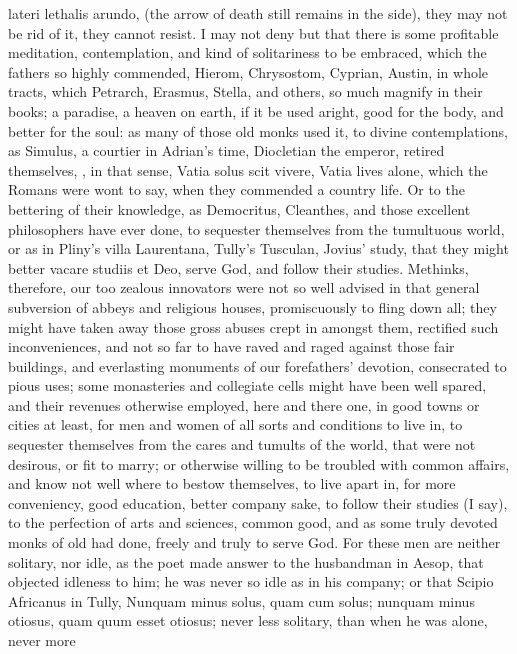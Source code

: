 {{lateri lethalis arundo, (the arrow of death still remains in the side),
they may not be rid of it, they cannot resist. I may not deny but
that there is some profitable meditation, contemplation, and kind of
solitariness to be embraced, which the fathers so highly commended,
 Hierom, Chrysostom, Cyprian, Austin, in whole tracts, which
Petrarch, Erasmus, Stella, and others, so much magnify in their books;
a paradise, a heaven on earth, if it be used aright, good for the body,
and better for the soul: as many of those old monks used it, to divine
contemplations, as Simulus, a courtier in Adrian's time, Diocletian the
emperor, retired themselves, \etc{}, in that sense, Vatia solus scit
vivere, Vatia lives alone, which the Romans were wont to say, when they
commended a country life. Or to the bettering of their knowledge, as
Democritus, Cleanthes, and those excellent philosophers have ever done,
to sequester themselves from the tumultuous world, or as in Pliny's
villa Laurentana, Tully's Tusculan, Jovius' study, that they might
better vacare studiis et Deo, serve God, and follow their studies.
Methinks, therefore, our too zealous innovators were not so well
advised in that general subversion of abbeys and religious houses,
promiscuously to fling down all; they might have taken away those gross
abuses crept in amongst them, rectified such inconveniences, and not so
far to have raved and raged against those fair buildings, and
everlasting monuments of our forefathers' devotion, consecrated to
pious uses; some monasteries and collegiate cells might have been well
spared, and their revenues otherwise employed, here and there one, in
good towns or cities at least, for men and women of all sorts and
conditions to live in, to sequester themselves from the cares and
tumults of the world, that were not desirous, or fit to marry; or
otherwise willing to be troubled with common affairs, and know not well
where to bestow themselves, to live apart in, for more conveniency,
good education, better company sake, to follow their studies (I say),
to the perfection of arts and sciences, common good, and as some truly
devoted monks of old had done, freely and truly to serve God. For these
men are neither solitary, nor idle, as the poet made answer to the
husbandman in Aesop, that objected idleness to him; he was never so
idle as in his company; or that Scipio Africanus in Tully,
Nunquam minus solus, quam cum solus; nunquam minus otiosus, quam quum
esset otiosus; never less solitary, than when he was alone, never more
}}
